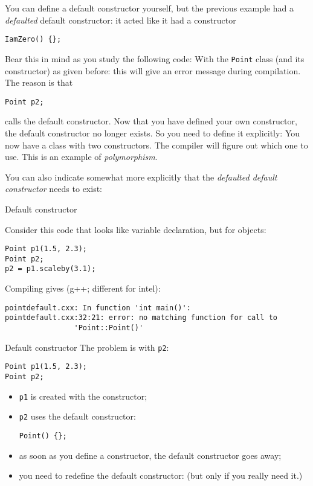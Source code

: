 You can define a default constructor yourself,
but the previous example had a
\emph{defaulted} default constructor:
it acted like it had a constructor
\begin{lstlisting}
IamZero() {};
\end{lstlisting}

Bear this in mind as you study the following code:
%
%
With the \lstinline{Point} class (and its constructor) as given before:
this will give an error message during compilation. The reason is
that 
\begin{lstlisting}
Point p2;
\end{lstlisting}
calls the default constructor. Now that you have defined your own
constructor, the default constructor no longer exists. So you need to
define it explicitly:
%
%
You now have a class with two constructors.
The compiler will figure out which one to use.
This is an example of \emph{polymorphism}.

You can also indicate somewhat more explicitly that the
\emph{defaulted default constructor} 
needs to exist:

\begin{slide}{Default constructor}
  \label{sl:obj-def-construct1}

  Consider this code that looks like variable declaration,
  but for objects:
\begin{lstlisting}
Point p1(1.5, 2.3);
Point p2;
p2 = p1.scaleby(3.1);
\end{lstlisting}

  Compiling gives (g++; different for intel):
\begin{lstlisting}
pointdefault.cxx: In function 'int main()':
pointdefault.cxx:32:21: error: no matching function for call to
                'Point::Point()'
\end{lstlisting}
\end{slide}

\begin{slide}{Default constructor}
  \label{sl:obj-def-construct2}
  The problem is with \lstinline{p2}:
\begin{lstlisting}
Point p1(1.5, 2.3);
Point p2;
\end{lstlisting}

\begin{itemize}
\item \lstinline{p1} is created with the constructor;
\item \lstinline{p2} uses the default constructor:
\begin{lstlisting}
Point() {};
\end{lstlisting}
\item as soon as you define a constructor, the default constructor
  goes away;
\item you need to redefine the default constructor:
  (but only if you really need it.)
\end{itemize}
\end{slide}

